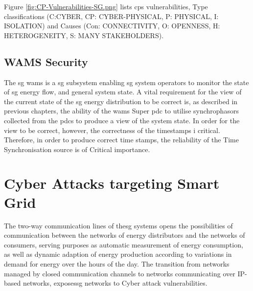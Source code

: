 Figure \ref{fig:CP-Vulnerabilities-SG.png} lists \acrlong{cps} vulnerabilities, Type classifications (C:CYBER, CP: CYBER-PHYSICAL, P: PHYSICAL, I: ISOLATION) and Causes (Con: CONNECTIVITY, O: OPENNESS, H: HETEROGENEITY,  S: MANY STAKEHOLDERS).




\subsection{WAMS Security} 

The \acrfull{sg} \acrfull{wams} is a \acrshort{sg} subsystem enabling \acrshort{sg} system operators to monitor the state of \acrshort{sg} energy flow, and general system state. 
A vital requirement for the view of the current state of the \acrshort{sg} energy distribution to be correct is, as described in previous chapters, the ability of the \acrshort{wams} Super \acrshort{pdc}  to utilise synchrophasors collected from the \acrshort{pdc}s to produce a view of the system state. In order for the view to be correct, however, the correctness of the timestamps i critical.  Therefore, in order to produce correct time stamps, the reliability of the Time Synchronisation source is of Critical importance.


 








\section{Cyber Attacks targeting Smart Grid}

The two-way communication lines of the\acrlong{sg} systems opens the possibilities of communication between the networks of energy distributors and the networks of consumers, serving purposes as automatic measurement of energy consumption, as well as dynamic adaption of energy production according to variations in demand for energy over the hours of the day.
The transition from networks managed by closed communication channels to networks communicating over IP-based networks, exposes\acrlong{sg} networks to Cyber attack vulnerabilities.



